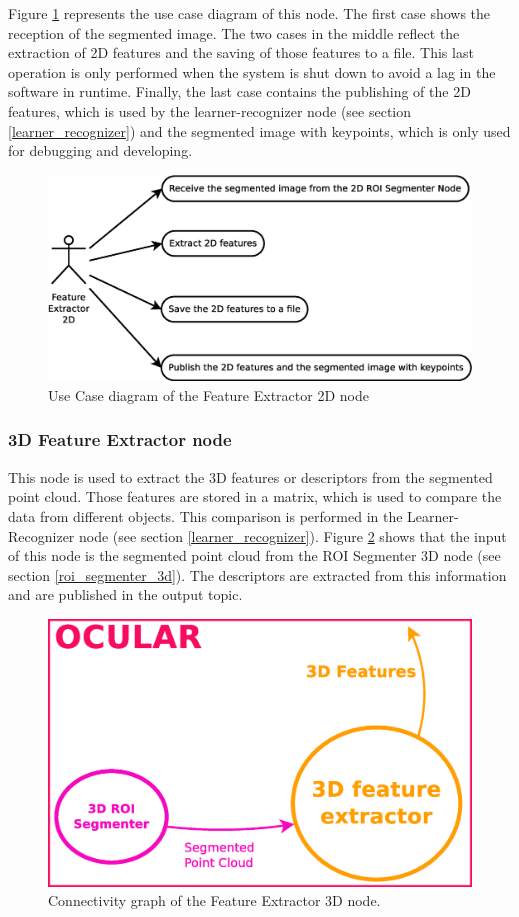 	Figure  \ref{uc_fe2d} represents the use case diagram of this node. 
	The first case shows the reception of the segmented image. 
	The two cases in the middle reflect the extraction of 2D features and the saving of those features to a file. 
	This last operation is only performed when the system is shut down to avoid a lag in the software in runtime. 
	Finally, the last case contains the publishing of the 2D features, which is used by the learner-recognizer node (see section \ref{learner_recognizer}) and the segmented image with keypoints, which is only used for debugging and developing. 
	\begin{figure}[H]
		\centering
			\includegraphics[scale=0.4]{img/diagrams/uc_feature_extractor_2d.eps}
			\caption[Use case diagram Feature Extractor 2D node]{Use Case diagram of the Feature Extractor 2D node}
		\label{uc_fe2d}
	\end{figure}


\subsubsection{3D Feature Extractor node}
\label{fe3d}
	This node is used to extract the 3D features or descriptors from the segmented point cloud. 
	Those features are stored in a matrix, which is used to compare the data from different objects. 
	This comparison is performed in the Learner-Recognizer node (see section \ref{learner_recognizer}).
	Figure \ref{node_fe3d} shows that the input of this node is the segmented point cloud from the ROI Segmenter 3D node (see section \ref{roi_segmenter_3d}). The descriptors are extracted from this information and are published in the output topic. 
	\\
		\begin{figure}[H]
			\begin{center}
			\includegraphics[width=0.5\linewidth]{img/diagrams/node_fe3d.eps}
			\caption[Feature Extractor 3D node I/O]{Connectivity graph of the Feature Extractor 3D node.}		
			\label{node_fe3d}
			\end{center}
		\end{figure}

